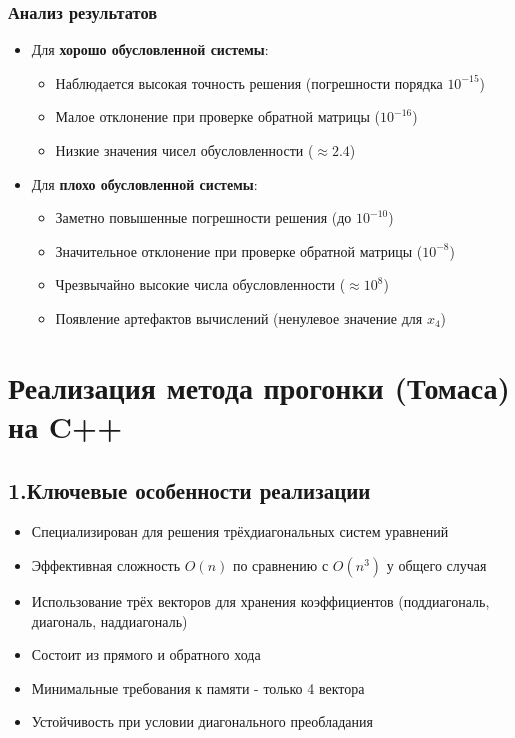 \documentclass[12pt, a4paper]{article}
\begin{document}
\subsubsection*{Анализ результатов}
\begin{itemize}
\item Для \textbf{хорошо обусловленной системы}:
\begin{itemize}
\item Наблюдается высокая точность решения (погрешности порядка $10^{-15}$)
\item Малое отклонение при проверке обратной матрицы ($10^{-16}$)
\item Низкие значения чисел обусловленности ($\approx 2.4$)
\end{itemize}

\item Для \textbf{плохо обусловленной системы}:
\begin{itemize}
\item Заметно повышенные погрешности решения (до $10^{-10}$)
\item Значительное отклонение при проверке обратной матрицы ($10^{-8}$)
\item Чрезвычайно высокие числа обусловленности ($\approx 10^8$)
\item Появление артефактов вычислений (ненулевое значение для $x_4$)
\end{itemize}
\end{itemize}
\newpage
\section{Реализация метода прогонки (Томаса) на C++}
\subsection*{1.Ключевые особенности реализации}

\begin{itemize}
\item Специализирован для решения трёхдиагональных систем уравнений
\item Эффективная сложность $O(n)$ по сравнению с $O(n^3)$ у общего случая
\item Использование трёх векторов для хранения коэффициентов (поддиагональ, диагональ, наддиагональ)
\item Состоит из прямого и обратного хода
\item Минимальные требования к памяти - только 4 вектора
\item Устойчивость при условии диагонального преобладания
\end{itemize}
\end{document}
